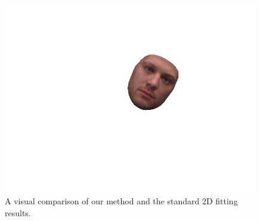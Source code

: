 \begin{figure}[h]
\begin{minipage}{.325\textwidth}
      \includegraphics[width=0.99\textwidth]{Figures/dataset/2D/7.png}
    \end{minipage}
    \caption{A visual comparison of our method and the standard 2D fitting results.}
    \label{f4.5}
\end{figure}

